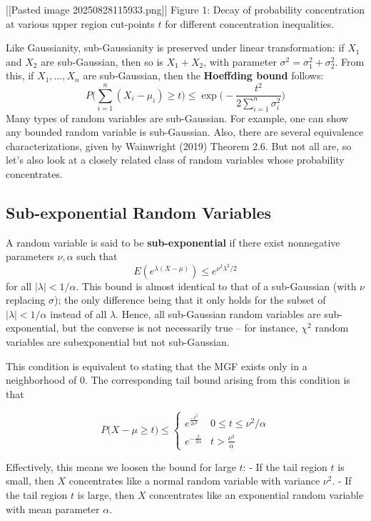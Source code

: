 \documentclass[
]{article}
\begin{document}
{[}{[}Pasted image 20250828115933.png{]}{]} Figure 1: Decay of
probability concentration at various upper region cut-points \(t\) for
different concentration inequalities.

Like Gaussianity, sub-Gaussianity is preserved under linear
transformation: if \(X_1\) and \(X_2\) are sub-Gaussian, then so is
\(X_1 + X_2\), with parameter \(\sigma^2 = \sigma_1^2 + \sigma_2^2\).
From this, if \(X_1, \ldots, X_n\) are sub-Gaussian, then the
\textbf{Hoeffding bound} follows:
\[P\Big(\sum_{i=1}^n (X_i - \mu_i) \geq t\Big) \leq \exp\Big(-\frac{t^2}{2\sum_{i=1}^n \sigma_i^2}\Big)\]
Many types of random variables are sub-Gaussian. For example, one can
show any bounded random variable is sub-Gaussian. Also, there are
several equivalence characterizations, given by Wainwright (2019)
Theorem 2.6. But not all are, so let's also look at a closely related
class of random variables whose probability concentrates.

\hypertarget{sub-exponential-random-variables}{%
\subsection{Sub-exponential Random
Variables}\label{sub-exponential-random-variables}}

A random variable is said to be \textbf{sub-exponential} if there exist
nonnegative parameters \(\nu, \alpha\) such that
\[E(e^{\lambda(X - \mu)}) \leq e^{\nu^2 \lambda^2 / 2}\] for all
\(|\lambda | < 1/\alpha\). This bound is almost identical to that of a
sub-Gaussian (with \(\nu\) replacing \(\sigma\)); the only difference
being that it only holds for the subset of \(|\lambda| < 1/\alpha\)
instead of all \(\lambda\). Hence, all sub-Gaussian random variables are
sub-exponential, but the converse is not necessarily true -- for
instance, \(\chi^2\) random variables are subexponential but not
sub-Gaussian.

This condition is equivalent to stating that the MGF exists only in a
neighborhood of 0. The corresponding tail bound arising from this
condition is that

\[P\Big(X - \mu \geq t\Big) \leq \begin{cases}e^\frac{-t^2}{2\nu^2} & 0 \leq t \leq \nu^2/\alpha \\ e^{-\frac{t}{2\alpha}} & t > \frac{\nu^2}{\alpha}\end{cases}\]

Effectively, this means we loosen the bound for large \(t\): - If the
tail region \(t\) is small, then \(X\) concentrates like a normal random
variable with variance \(\nu^2\). - If the tail region \(t\) is large,
then \(X\) concentrates like an exponential random variable with mean
parameter \(\alpha\).
\end{document}
